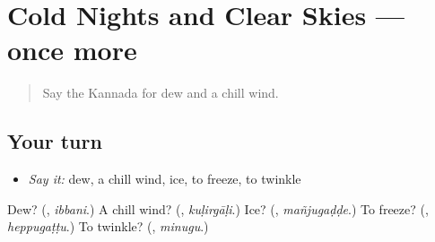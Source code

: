 \section[(dialogue)]{Cold Nights and Clear Skies — once more}

\label{lesson:KA-R489-review-final-489}



\begin{quote}
Say the Kannada for dew and a chill wind.
\end{quote}

\subsection*{Your turn}
\begin{itemize}
\raggedright
  \item \emph{Say it:} dew, a chill wind, ice, to freeze, to twinkle
\end{itemize}

\begin{tcolorbox}[breakable,colback=teal!4,colframe=teal!35!black,title={Before you move on}]
Dew? (\textbf{}, \emph{ibbani}.) A chill wind? (\textbf{}, \emph{kuḷirgāḷi}.) Ice? (\textbf{}, \emph{mañjugaḍḍe}.) To freeze? (\textbf{}, \emph{heppugaṭṭu}.) To twinkle? (\textbf{}, \emph{minugu}.)
\end{tcolorbox}
